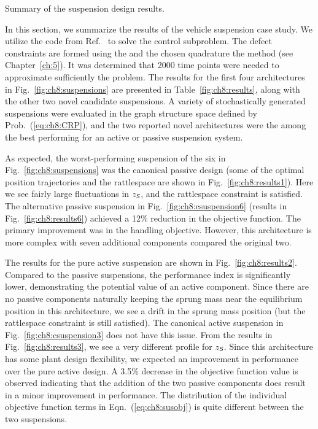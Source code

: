 \begin{table}
\caption{Summary of the suspension design results.\label{fig:ch8:results}}

\end{table}

In this section, we summarize the results of the vehicle suspension case study.
We utilize the code from Ref.~\cite{github-dt-qp-project} to solve the control subproblem.
The defect constraints are formed using the  and the chosen quadrature the  method (see Chapter~\ref{ch:5}).
It was determined that 2000 time points were needed to approximate sufficiently the problem.
The results for the first four architectures in Fig.~\ref{fig:ch8:suspensions} are presented in Table~\ref{fig:ch8:results}, along with the other two novel candidate suspensions.
A variety of stochastically generated suspensions were evaluated in the graph structure space defined by Prob.~(\ref{eq:ch8:CRP}), and the two reported novel architectures were the among the best performing for an active or passive suspension system.

As expected, the worst-performing suspension of the six in Fig.~\ref{fig:ch8:suspensions} was the canonical passive design (some of the optimal position trajectories and the rattlespace are shown in Fig.~\ref{fig:ch8:results1}).
Here we see fairly large fluctuations in $z_{\textsl{\textsf{S}}}$, and the rattlespace constraint is satisfied. 
The alternative passive suspension in Fig.~\ref{fig:ch8:csuspension6} (results in Fig.~\ref{fig:ch8:results6}) achieved a 12\% reduction in the objective function.
The primary improvement was in the handling objective.
However, this architecture is more complex with seven additional components compared the original two.

The results for the pure active suspension are shown in Fig.~\ref{fig:ch8:results2}.
Compared to the passive suspensions, the performance index is significantly lower, demonstrating the potential value of an active component.
Since there are no passive components naturally keeping the sprung mass near the equilibrium position in this architecture, we see a drift in the sprung mass position (but the rattlespace constraint is still satisfied).
The canonical active suspension in Fig.~\ref{fig:ch8:csuspension3} does not have this issue. 
From the results in Fig.~\ref{fig:ch8:results3}, we see a very different profile for $z_{\textsl{\textsf{S}}}$.
Since this architecture has some plant design flexibility, we expected an improvement in performance over the pure active design.
A 3.5\% decrease in the objective function value is observed indicating that the addition of the two passive components does result in a minor improvement in performance.
The distribution of the individual objective function terms in Eqn.~(\ref{eq:ch8:susobj}) is quite different between the two suspensions.

